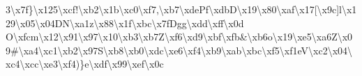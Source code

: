 \begin{DoxyCompactItemize}
3\textbackslash{}x7f\}\textbackslash{}x125\textbackslash{}xcf!\textbackslash{}xb2\textbackslash{}x1b\textbackslash{}xc0\textbackslash{}xf7,\textbackslash{}xb7\textbackslash{}xde\+Pf\textbackslash{}xdb\+D\textbackslash{}x19\textbackslash{}x80\textbackslash{}xaf\textbackslash{}x17\mbox{[}\textbackslash{}x9c\mbox{]}l\textbackslash{}x129\textbackslash{}x05\textbackslash{}x04\+D\+N\textbackslash{}xa1z\textbackslash{}x88\textbackslash{}x1f\textbackslash{}xbc\textbackslash{}x7f\+Dgg\textbackslash{}xdd\textbackslash{}xff\textbackslash{}x0d O\textbackslash{}xfcm\textbackslash{}x12\textbackslash{}x91\textbackslash{}x97\textbackslash{}x10\textbackslash{}xb3\textbackslash{}xb7\+Z\textbackslash{}xf6\textbackslash{}xd9\textbackslash{}xbf\textbackslash{}xfb\&\textbackslash{}xb6o\textbackslash{}x19\textbackslash{}xe5\textbackslash{}xa6\+Z\textbackslash{}x09\#\textbackslash{}xa4\textbackslash{}xc1\textbackslash{}xb2\textbackslash{}x97\+S\textbackslash{}xb8\textbackslash{}xb0\textbackslash{}xdc\textbackslash{}xe6\textbackslash{}xf4\textbackslash{}xb9\textbackslash{}xab\textbackslash{}xbc\textbackslash{}xf5\textbackslash{}xf1e\+V\textbackslash{}xc2\textbackslash{}x04\textbackslash{}xc4\textbackslash{}xcc\textbackslash{}xe3\textbackslash{}xf4)\}e\textbackslash{}xdf\textbackslash{}x99\textbackslash{}xef\textbackslash{}x0c 
\end{DoxyCompactItemize}
